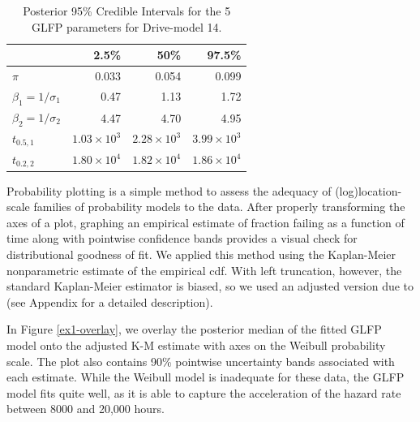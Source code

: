\documentclass[aap]{imsart}
\begin{document}
\begin{table}[H]
\centering
\begin{tabular}{lrrr}
  \hline
 & 2.5\% & 50\% & 97.5\% \\ 
  \hline
$\pi$ & 0.033 & 0.054 & 0.099 \\ 
 $\beta_1 = 1/\sigma_1 $ & 0.47 & 1.13 & 1.72 \\ 
  $\beta_2 = 1/\sigma_2$ & 4.47 & 4.70 & 4.95 \\ 
  $t_{0.5,1}$ & $1.03\times 10^3$  & $2.28 \times 10^3$ & $3.99 \times 10^3$\\ 
  $t_{0.2,2}$ & $1.80 \times 10^4$ & $1.82 \times 10^4$ & $1.86 \times 10^4$ \\ 
   \hline
\end{tabular}
\caption{Posterior 95\% Credible Intervals for the 5 GLFP parameters for Drive-model 14.}
\label{table:1}
\end{table}


Probability plotting is a simple method to assess the adequacy of (log)location-scale families of probability models to the data.  After properly transforming the axes of a plot, graphing an empirical estimate of fraction failing as a function of time along with pointwise confidence bands provides a visual check for distributional goodness of fit.  We applied this method using the Kaplan-Meier nonparametric estimate of the empirical cdf.  With left truncation, however, the standard Kaplan-Meier estimator is biased, so we used an adjusted version due to \citet[Chapter 11]{meeker} (see Appendix for a detailed description).   


In Figure \ref{ex1-overlay}, we overlay the posterior median of the fitted GLFP model onto the adjusted K-M estimate with axes on the Weibull probability scale.  The plot also contains 90\% pointwise uncertainty bands associated with each estimate. While the Weibull model is inadequate for these data, the GLFP model fits quite well, as it is able to capture the acceleration of the hazard rate between 8000 and 20,000 hours. %
\end{document}
